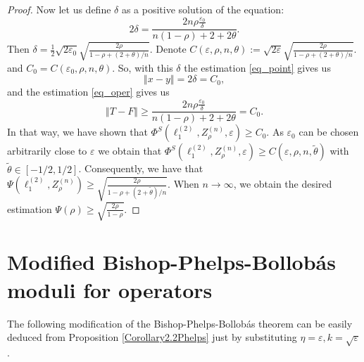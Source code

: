 \documentclass[11pt,a4paper]{amsart}
\newcommand{\eps}{\varepsilon}
\newcommand{\norm}[1]{\left\Vert#1\right\Vert}
\numberwithin{equation}{section}
\theoremstyle{plain}
\theoremstyle{definition}
\renewcommand{\geq}{\geqslant}
\begin{document}
\begin{proof}
Now let us define $\delta$ as a positive solution of the equation:
$$2\delta=\frac{2n\rho\frac{\eps_0}{\delta}}{n(1-\rho)+2+2\theta}.$$
Then $\delta=\frac{1}{2}\sqrt{2\eps_0}\sqrt{\frac{2\rho}{1-\rho + (2+\theta)/n}}$. Denote $C(\eps,\rho,n, \theta):= \sqrt{2\eps}\sqrt{\frac{2\rho}{1-\rho + (2+\theta)/n}}.$ and $C_0=C(\eps_0,\rho,n, \theta)$. So, with this $\delta$ the estimation \eqref{eq_point} gives us 
$$ \norm{x-y}=2\delta=C_0,$$
and the estimation \eqref{eq_oper} gives us 
$$\norm{T-F}\geq \frac{2n\rho\frac{\eps_0}{\delta}}{n(1-\rho)+2+2\theta}=C_0.$$
In that way, we have shown that $\Phi^S(\ell_1^{(2)}, Z^{(n)}_\rho,\eps)\geq C_0$. As $\eps_0$ can be chosen arbitrarily close to $\eps$ we obtain that $\Phi^S(\ell_1^{(2)}, Z^{(n)}_\rho,\eps)\geq C(\eps,\rho,n, \tilde{\theta})$ with $\tilde{\theta}\in [-1/2, 1/2]$. Consequently, we have that $\Psi(\ell_1^{(2)}, Z^{(n)}_\rho)\geq \sqrt{\frac{2\rho}{1-\rho + (2+\tilde{\theta})/n}}$. When $n\rightarrow \infty$, we obtain the desired estimation $\Psi(\rho)\geq\sqrt{\frac{2\rho}{1-\rho}}$.
\end{proof}

\section{Modified Bishop-Phelps-Bollob\'{a}s moduli for operators} \label{sec4}
The following modification of the Bishop-Phelps-Bollob\'{a}s theorem can be easily deduced from Proposition \ref{Corollary2.2Phelps} just by substituting $\eta = \eps, k = \sqrt{\eps}$.
\end{document}
